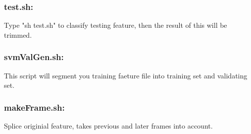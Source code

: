 \documentclass[10pt,a4paper]{article}
\begin{document}
\subsubsection*{test.sh:}
Type "sh test.sh" to classify testing feature, then the result of this will be trimmed.
\subsubsection*{svmValGen.sh:}
This script will segment you training faeture file into training set and validating set.
\subsubsection*{makeFrame.sh:}
Splice originial feature, takes previous and later frames into account.
\end{document}

